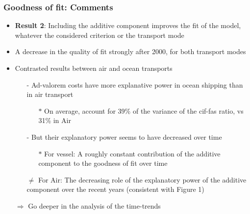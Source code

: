 \documentclass[10 pt,Helvetica, french]{beamer}
\begin{document}
\begin{frame}
\frametitle{Goodness of fit: Comments}
\begin{itemize}
\item \textbf{Result 2}: Including the additive component improves the fit of the model, whatever the considered criterion or the transport mode \vspace{0.1cm}
\item A decrease in the quality of fit strongly after 2000, for both transport modes \vspace{0.1cm}
\item Contrasted results between air and ocean transports \vspace{0.1cm}
\begin{itemize}
\item[-] Ad-valorem costs have more explanative power in ocean shipping than in air transport \vspace{0.1cm}
\begin{itemize}
\item[$\ast$] On average, account for 39\% of the variance of the cif-fas ratio, vs 31\% in Air \vspace{0.1cm}
\end{itemize}
\item[-] But their explanatory power seems to have decreased over time \vspace{0.1cm}
\begin{itemize}
\item[$\ast$] For vessel: A roughly constant contribution of the additive component to the goodness of fit over time\vspace{0.1cm}
\end{itemize}
\item[$\neq$] For Air: The decreasing role of the explanatory power of the additive component over the recent years (consistent with Figure 1)\vspace{0.1cm}
\end{itemize}
\item[$\Rightarrow$] Go deeper in the analysis of the time-trends
\end{itemize}
\hyperlink{slide_goodnessfit}{}
\end{frame}
\end{document}
